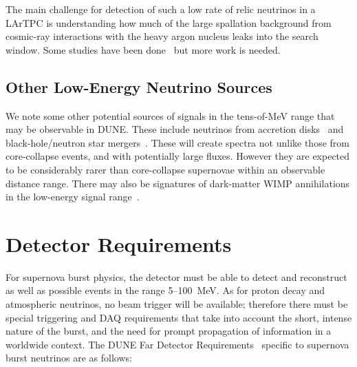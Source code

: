  The main challenge for detection of such
a low rate of relic neutrinos in a LArTPC is understanding how much of
the large spallation background from cosmic-ray interactions with the
heavy argon nucleus 
leaks into the search window.   Some studies have been done~\cite{Barker:2012nb} but more work is needed.

\subsection{Other Low-Energy Neutrino Sources}

We note some other potential sources of signals in the tens-of-MeV range that may be observable in DUNE.  These include neutrinos from accretion disks~\cite{Caballero:2011dw} and black-hole/neutron star mergers~\cite{Caballero:2009ww}.  These will create spectra not unlike those from core-collapse events, and with potentially large fluxes.  However they are expected to be considerably rarer than core-collapse supernovae within an observable distance range.  There may also be signatures of dark-matter WIMP annihilations in the low-energy signal range~\cite{Rott:2012qb, Bernal:2012qh}.



\section{Detector Requirements}
\label{sec:physics-snblowe-detector-requirements}

For supernova burst physics, the detector must be able to detect and reconstruct as well as possible  events in the range 5--100~MeV.  As for proton decay and atmospheric neutrinos, no beam trigger will be available; therefore there must be special triggering and DAQ requirements that take into account the short, intense nature of the burst, and the need for prompt propagation of information in a worldwide context.
The DUNE Far Detector
Requirements~\cite{lbnfdune-cdr-req} specific to supernova burst neutrinos are as follows:

